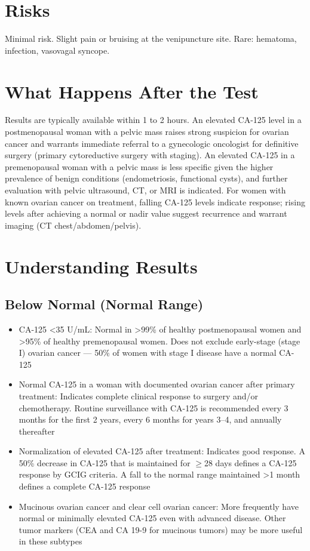 \section*{Risks}
Minimal risk. Slight pain or bruising at the venipuncture site. Rare: hematoma, infection, vasovagal syncope.

\section*{What Happens After the Test}
Results are typically available within 1 to 2 hours. An elevated CA-125 level in a postmenopausal woman with a pelvic mass raises strong suspicion for ovarian cancer and warrants immediate referral to a gynecologic oncologist for definitive surgery (primary cytoreductive surgery with staging). An elevated CA-125 in a premenopausal woman with a pelvic mass is less specific given the higher prevalence of benign conditions (endometriosis, functional cysts), and further evaluation with pelvic ultrasound, CT, or MRI is indicated. For women with known ovarian cancer on treatment, falling CA-125 levels indicate response; rising levels after achieving a normal or nadir value suggest recurrence and warrant imaging (CT chest/abdomen/pelvis).

\section*{Understanding Results}

\subsection*{Below Normal (Normal Range)}
\begin{itemize}
  \item CA-125 <35 U/mL: Normal in >99\% of healthy postmenopausal women and >95\% of healthy premenopausal women. Does not exclude early-stage (stage I) ovarian cancer --- 50\% of women with stage I disease have a normal CA-125
  \item Normal CA-125 in a woman with documented ovarian cancer after primary treatment: Indicates complete clinical response to surgery and/or chemotherapy. Routine surveillance with CA-125 is recommended every 3 months for the first 2 years, every 6 months for years 3--4, and annually thereafter
  \item Normalization of elevated CA-125 after treatment: Indicates good response. A 50\% decrease in CA-125 that is maintained for $\geq$28 days defines a CA-125 response by GCIG criteria. A fall to the normal range maintained >1 month defines a complete CA-125 response
  \item Mucinous ovarian cancer and clear cell ovarian cancer: More frequently have normal or minimally elevated CA-125 even with advanced disease. Other tumor markers (CEA and CA 19-9 for mucinous tumors) may be more useful in these subtypes
\end{itemize}


